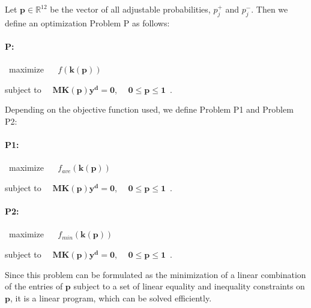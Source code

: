 		Let $\mathbf{p} \in \mathbb{R}^{12}$ be the vector of all adjustable
		probabilities, $p_j^+$ and $p_j^-$. Then we define an optimization Problem P as follows:
		
		\paragraph{P:} ~maximize ~~ $f(\mathbf{k(p)})$

		\vspace{1.5mm}

		\hspace{2.5mm} subject to ~~$\mathbf{M}\mathbf{K(p)}\mathbf{y^d} =
		\mathbf{0}$, ~~$\mathbf{0} \leq \mathbf{p} \leq \mathbf{1}$~.
		\vspace{2mm}
		

		\noindent Depending on the objective function used, we define Problem P1 and Problem P2:
		
		\paragraph{P1:} ~maximize ~~ $f_{ave}(\mathbf{k(p)})$

		\vspace{1.5mm}

		\hspace{4.5mm} subject to ~~$\mathbf{M}\mathbf{K(p)}\mathbf{y^d} =
		\mathbf{0}$, ~~$\mathbf{0} \leq \mathbf{p} \leq \mathbf{1}$~.
		\vspace{2mm}
		
		
		\paragraph{P2:} ~maximize ~~ $f_{min}(\mathbf{k(p)})$

		\vspace{1.5mm}

		\hspace{4.5mm} subject to ~~$\mathbf{M}\mathbf{K(p)}\mathbf{y^d} =
		\mathbf{0}$, ~~$\mathbf{0} \leq \mathbf{p} \leq \mathbf{1}$~.
		\vspace{2mm}
		
		
		Since this problem can be formulated as the minimization of a linear
		combination of the entries of $\mathbf{p}$ subject to a set of
		linear equality and inequality constraints on $\mathbf{p}$, it is a
		linear program, which can be solved efficiently.
		
